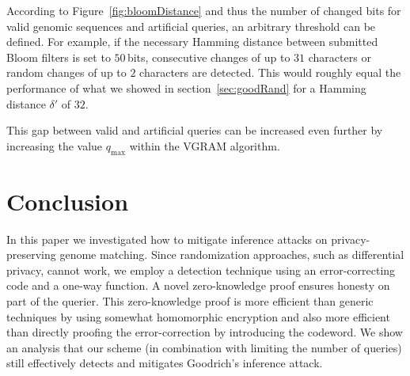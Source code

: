 \documentclass{llncs}
\begin{document}
According to Figure~\ref{fig:bloomDistance} and thus the number of changed bits for valid genomic sequences and artificial queries, an arbitrary threshold can be defined.
For example, if the necessary Hamming distance between submitted Bloom filters is set to $50$\,bits, consecutive changes of up to $31$ characters or random changes of up to $2$ characters are detected.
This would roughly equal the performance of what we showed in section~\ref{sec:goodRand} for a Hamming distance $\delta'$ of $32$.

This gap between valid and artificial queries can be increased even further by increasing the value $q_{\text{max}}$ within the VGRAM algorithm.

\section{Conclusion}
\label{sec:conclusion}

In this paper we investigated how to mitigate inference attacks on privacy-preserving genome matching.
Since randomization approaches, such as differential privacy, cannot work, we employ a detection technique using an error-correcting code and a one-way function.
A novel zero-knowledge proof ensures honesty on part of the querier.
This zero-knowledge proof is more efficient than generic techniques by using somewhat homomorphic encryption and also more efficient than directly proofing the error-correction by introducing the codeword.
We show an analysis that our scheme (in combination with limiting the number of queries) still effectively detects and mitigates Goodrich's inference attack.
\end{document}
